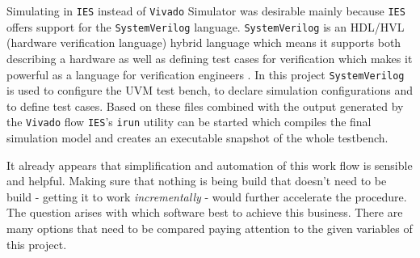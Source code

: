 Simulating in \texttt{\acs{IES}} instead of \texttt{Vivado} Simulator was desirable mainly because \texttt{\acs{IES}} offers support for the \texttt{SystemVerilog} language. \texttt{SystemVerilog} is an \acs{HDL}/\acs{HVL} (hardware verification language) hybrid language which means it supports both describing a hardware as well as defining test cases for verification which makes it powerful as a language for verification engineers \cite[see][pp. 3f]{Cad11}. In this project \texttt{SystemVerilog} is used to configure the \acs{UVM} test bench, to declare simulation configurations and to define test cases. Based on these files combined with the output generated by the \texttt{Vivado} flow \texttt{\acs{IES}}'s \texttt{irun} utility can be started which compiles the final simulation model and creates an executable snapshot of the whole testbench.

It already appears that simplification and automation of this work flow is sensible and helpful. Making sure that nothing is being build that doesn't need to be build - getting it to work \textit{incrementally} - would further accelerate the procedure. The question arises with which software best to achieve this business. There are many options that need to be compared paying attention to the given variables of this project.
